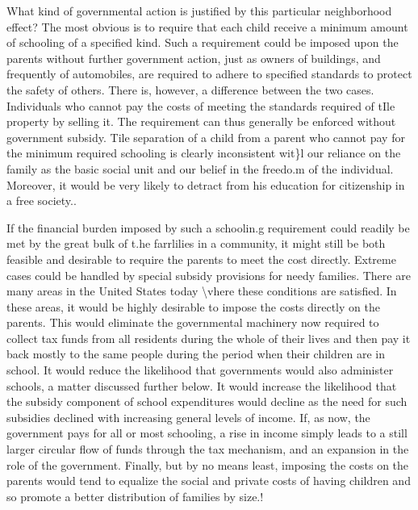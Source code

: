 \documentclass[11pt,openany]{book}
\begin{document}
What kind of governmental action is justified by this particular neighborhood effect? The most obvious is to require that each child receive a minimum amount of schooling of a specified kind. Such a requirement could be imposed upon the parents without further government action, just as owners of buildings, and frequently of automobiles, are required to adhere to specified standards to protect the safety of others. There is, however, a difference between the two cases. Individuals who cannot pay the costs of meeting the standards required of tIle property by selling it. The requirement can thus generally be enforced without government subsidy. Tile separation of a child from a parent who cannot pay for the minimum required schooling is clearly inconsistent wit\}l our reliance on the family as the basic social unit and our belief in the freedo.m of the individual. Moreover, it would be very likely to detract from his education for citizenship in a free society..

If the financial burden imposed by such a schoolin.g requirement could readily be met by the great bulk of t.he farrlilies in a community, it might still be both feasible and desirable to require the parents to meet the cost directly. Extreme cases could be handled by special subsidy provisions for needy families. There are many areas in the United States today \textbackslash{}vhere these conditions are satisfied. In these areas, it would be highly desirable to impose the costs directly on the parents. This would eliminate the governmental machinery now required to collect tax funds from all residents during the whole of their lives and then pay it back mostly to the same people during the period when their children are in school. It would reduce the likelihood that governments would also administer schools, a matter discussed further below. It would increase the likelihood that the subsidy component of school expenditures would decline as the need for such subsidies declined with increasing general levels of income. If, as now, the government pays for all or most schooling, a rise in income simply leads to a still larger circular flow of funds through the tax mechanism, and an expansion in the role of the government. Finally, but by no means least, imposing the costs on the parents would tend to equalize the social and private costs of having children and so promote a better distribution of families by size.!
\end{document}
